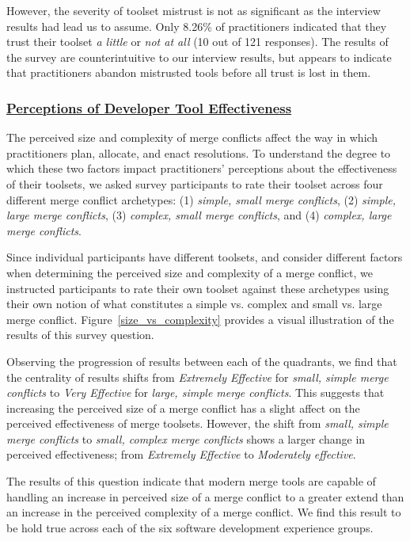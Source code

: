 However, the severity of toolset mistrust is not as significant as the interview results had lead us to assume.
Only 8.26\% of practitioners indicated that they trust their toolset \textit{a little} or \textit{not at all} (10 out of 121 responses).
The results of the survey are counterintuitive to our interview results, but appears to indicate that practitioners abandon mistrusted tools before all trust is lost in them.

\subsubsection{\underline{Perceptions of Developer Tool Effectiveness}}
The perceived size and complexity of merge conflicts affect the way in which practitioners plan, allocate, and enact resolutions.
To understand the degree to which these two factors impact practitioners' perceptions about the effectiveness of their toolsets, we asked survey participants to rate their toolset across four different merge conflict archetypes: (1) \textit{simple, small merge conflicts}, (2) \textit{simple, large merge conflicts}, (3) \textit{complex, small merge conflicts}, and (4) \textit{complex, large merge conflicts}.

Since individual participants have different toolsets, and consider different factors when determining the perceived size and complexity of a merge conflict, we instructed participants to rate their own toolset against these archetypes using their own notion of what constitutes a simple vs. complex and small vs. large merge conflict.
Figure~\ref{size_vs_complexity} provides a visual illustration of the results of this survey question.

Observing the progression of results between each of the quadrants, we find that the centrality of results shifts from \textit{Extremely Effective} for \textit{small, simple merge conflicts} to \textit{Very Effective} for \textit{large, simple merge conflicts}.
This suggests that increasing the perceived size of a merge conflict has a slight affect on the perceived effectiveness of merge toolsets.
However, the shift from \textit{small, simple merge conflicts} to \textit{small, complex merge conflicts} shows a larger change in perceived effectiveness; from \textit{Extremely Effective} to \textit{Moderately effective}.

The results of this question indicate that modern merge tools are capable of handling an increase in perceived size of a merge conflict to a greater extend than an increase in the perceived complexity of a merge conflict.
We find this result to be hold true across each of the six software development experience groups.

